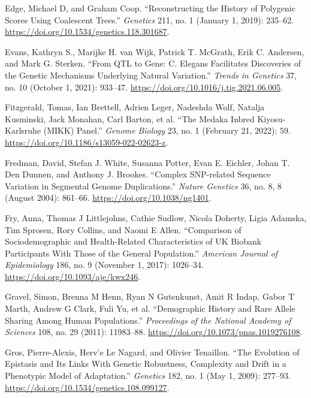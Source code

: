 \documentclass[
]{book}
\newlength{\cslhangindent}
\newlength{\cslentryspacingunit} %
\newenvironment{CSLReferences}[2] %
 {%
  \setlength{\parindent}{0pt}
  \ifodd #1
  \let\oldpar\par
  \def\par{\hangindent=\cslhangindent\oldpar}
  \fi
  \setlength{\parskip}{#2\cslentryspacingunit}
 }%
 {}
\begin{document}
\begin{CSLReferences}{1}{0}
\leavevmode{}%
Edge, Michael D, and Graham Coop. {``Reconstructing the {History} of {Polygenic Scores Using Coalescent Trees}.''} \emph{Genetics} 211, no. 1 (January 1, 2019): 235--62. \url{https://doi.org/10.1534/genetics.118.301687}.

\leavevmode{}%
Evans, Kathryn S., Marijke H. van Wijk, Patrick T. McGrath, Erik C. Andersen, and Mark G. Sterken. {``From {QTL} to Gene: {C}. Elegans Facilitates Discoveries of the Genetic Mechanisms Underlying Natural Variation.''} \emph{Trends in Genetics} 37, no. 10 (October 1, 2021): 933--47. \url{https://doi.org/10.1016/j.tig.2021.06.005}.

\leavevmode{}%
Fitzgerald, Tomas, Ian Brettell, Adrien Leger, Nadeshda Wolf, Natalja Kusminski, Jack Monahan, Carl Barton, et al. {``The {Medaka Inbred Kiyosu-Karlsruhe} ({MIKK}) Panel.''} \emph{Genome Biology} 23, no. 1 (February 21, 2022): 59. \url{https://doi.org/10.1186/s13059-022-02623-z}.

\leavevmode{}%
Fredman, David, Stefan J. White, Susanna Potter, Evan E. Eichler, Johan T. Den Dunnen, and Anthony J. Brookes. {``Complex {SNP-related} Sequence Variation in Segmental Genome Duplications.''} \emph{Nature Genetics} 36, no. 8, 8 (August 2004): 861--66. \url{https://doi.org/10.1038/ng1401}.

\leavevmode{}%
Fry, Anna, Thomas J Littlejohns, Cathie Sudlow, Nicola Doherty, Ligia Adamska, Tim Sprosen, Rory Collins, and Naomi E Allen. {``Comparison of {Sociodemographic} and {Health-Related Characteristics} of {UK Biobank Participants With Those} of the {General Population}.''} \emph{American Journal of Epidemiology} 186, no. 9 (November 1, 2017): 1026--34. \url{https://doi.org/10.1093/aje/kwx246}.

\leavevmode{}%
Gravel, Simon, Brenna M Henn, Ryan N Gutenkunst, Amit R Indap, Gabor T Marth, Andrew G Clark, Fuli Yu, et al. {``Demographic History and Rare Allele Sharing Among Human Populations.''} \emph{Proceedings of the National Academy of Sciences} 108, no. 29 (2011): 11983--88. \url{https://doi.org/10.1073/pnas.1019276108}.

\leavevmode{}%
Gros, Pierre-Alexis, Herv'e Le Nagard, and Olivier Tenaillon. {``The {Evolution} of {Epistasis} and {Its Links With Genetic Robustness}, {Complexity} and {Drift} in a {Phenotypic Model} of {Adaptation}.''} \emph{Genetics} 182, no. 1 (May 1, 2009): 277--93. \url{https://doi.org/10.1534/genetics.108.099127}.


\end{CSLReferences}
\end{document}
